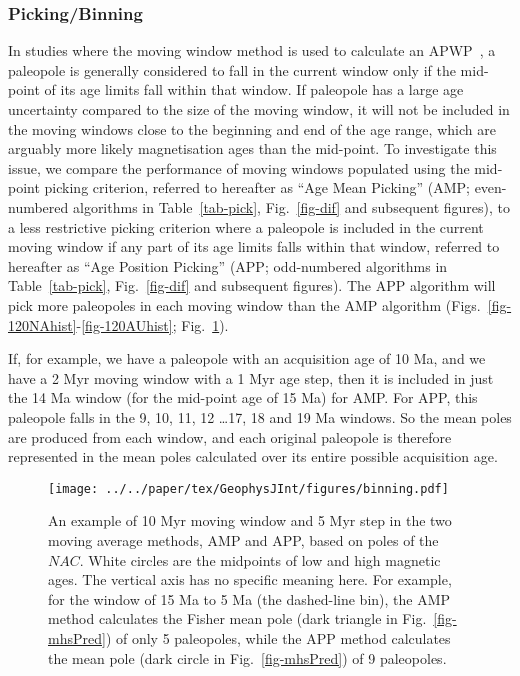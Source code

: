 \subsubsection{Picking/Binning}\label{sec:p}

In studies where the moving window method is used to calculate an
APWP~\citep{T99,T08}, a paleopole is generally considered to fall in the current
window only if the mid-point of its age limits fall within that window. If
paleopole has a large age uncertainty compared to the size of the moving window,
it will not be included in the moving windows close to the beginning and end of
the age range, which are arguably more likely magnetisation ages than the
mid-point. To investigate this issue, we compare the performance of moving
windows populated using the mid-point picking criterion, referred to hereafter
as ``Age Mean Picking'' (AMP\@; even-numbered algorithms in
Table~\ref{tab-pick}, Fig.~\ref{fig-dif} and subsequent figures), to a less
restrictive picking criterion where a paleopole is included in the current
moving window if any part of its age limits falls within that window, referred
to hereafter as ``Age Position Picking'' (APP\@; odd-numbered algorithms in
Table~\ref{tab-pick}, Fig.~\ref{fig-dif} and subsequent figures). The APP
algorithm will pick more paleopoles in each moving window than the AMP algorithm
(Figs.~\ref{fig-120NAhist}-\ref{fig-120AUhist}; Fig.~\ref{fig-nac-maplat}).

If, for example, we have a paleopole with an acquisition age of 10
Ma, and we have a 2 Myr moving window with a 1 Myr age step, then it is included
in just the 14 Ma window (for the mid-point age of 15 Ma) for
AMP\@. For APP, this paleopole falls in the 9, 10,
11, 12 \ldots 17, 18 and
19 Ma windows. So the mean poles are produced from each window, and
each original paleopole is therefore represented in the mean poles calculated
over its entire possible acquisition age.

\begin{figure}
\centering
\texttt{[image: ../../paper/tex/GeophysJInt/figures/binning.pdf]}
\caption[Moving average (MA) methods]{An example of 10 Myr moving window and 5
Myr step in the two moving average methods, AMP and APP, based on poles of the
$NAC$. White circles are the midpoints of low and high magnetic ages. The
vertical axis has no specific meaning here. For example, for the window of 15 Ma
to 5 Ma (the dashed-line bin), the AMP method calculates the Fisher mean pole
(dark triangle in Fig.~\ref{fig-mhsPred}) of only 5 paleopoles, while the APP
method calculates the mean pole (dark circle in Fig.~\ref{fig-mhsPred}) of 9
paleopoles.}\label{fig-nac-maplat}
\end{figure}

